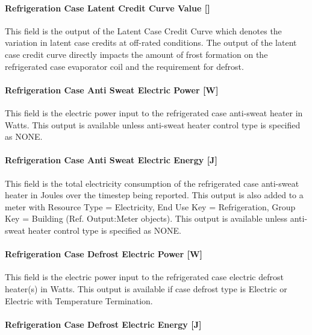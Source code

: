 \paragraph{Refrigeration Case Latent Credit Curve Value {[]}}\label{refrigeration-case-latent-credit-curve-value}

This field is the output of the Latent Case Credit Curve which denotes the variation in latent case credits at off-rated conditions. The output of the latent case credit curve directly impacts the amount of frost formation on the refrigerated case evaporator coil and the requirement for defrost.

\paragraph{Refrigeration Case Anti Sweat Electric Power {[}W{]}}\label{refrigeration-case-anti-sweat-electric-power-w}

This field is the electric power input to the refrigerated case anti-sweat heater in Watts. This output is available unless anti-sweat heater control type is specified as NONE.

\paragraph{Refrigeration Case Anti Sweat Electric Energy {[}J{]}}\label{refrigeration-case-anti-sweat-electric-energy-j}

This field is the total electricity consumption of the refrigerated case anti-sweat heater in Joules over the timestep being reported. This output is also added to a meter with Resource Type = Electricity, End Use Key = Refrigeration, Group Key = Building (Ref. Output:Meter objects). This output is available unless anti-sweat heater control type is specified as NONE.

\paragraph{Refrigeration Case Defrost Electric Power {[}W{]}}\label{refrigeration-case-defrost-electric-power-w}

This field is the electric power input to the refrigerated case electric defrost heater(s) in Watts. This output is available if case defrost type is Electric or Electric with Temperature Termination.

\paragraph{Refrigeration Case Defrost Electric Energy {[}J{]}}\label{refrigeration-case-defrost-electric-energy-j}

